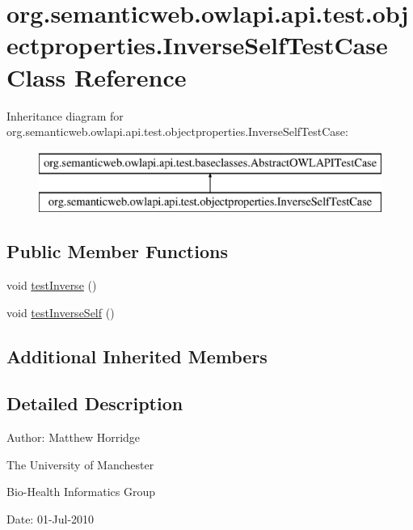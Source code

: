 \hypertarget{classorg_1_1semanticweb_1_1owlapi_1_1api_1_1test_1_1objectproperties_1_1_inverse_self_test_case}{\section{org.\-semanticweb.\-owlapi.\-api.\-test.\-objectproperties.\-Inverse\-Self\-Test\-Case Class Reference}
\label{classorg_1_1semanticweb_1_1owlapi_1_1api_1_1test_1_1objectproperties_1_1_inverse_self_test_case}
}
Inheritance diagram for org.\-semanticweb.\-owlapi.\-api.\-test.\-objectproperties.\-Inverse\-Self\-Test\-Case\-:\begin{figure}[H]
\begin{center}
\leavevmode
\includegraphics[height=2.000000cm]{classorg_1_1semanticweb_1_1owlapi_1_1api_1_1test_1_1objectproperties_1_1_inverse_self_test_case}
\end{center}
\end{figure}
\subsection*{Public Member Functions}
\begin{DoxyCompactItemize}
\item 
void \hyperlink{classorg_1_1semanticweb_1_1owlapi_1_1api_1_1test_1_1objectproperties_1_1_inverse_self_test_case_a8284d99873d8369ae985d186a499e902}{test\-Inverse} ()
\item 
void \hyperlink{classorg_1_1semanticweb_1_1owlapi_1_1api_1_1test_1_1objectproperties_1_1_inverse_self_test_case_a17f7de1b520de9c64fc48367ce67cf9d}{test\-Inverse\-Self} ()
\end{DoxyCompactItemize}
\subsection*{Additional Inherited Members}


\subsection{Detailed Description}
Author\-: Matthew Horridge\par
 The University of Manchester\par
 Bio-\/\-Health Informatics Group\par
 Date\-: 01-\/\-Jul-\/2010 

